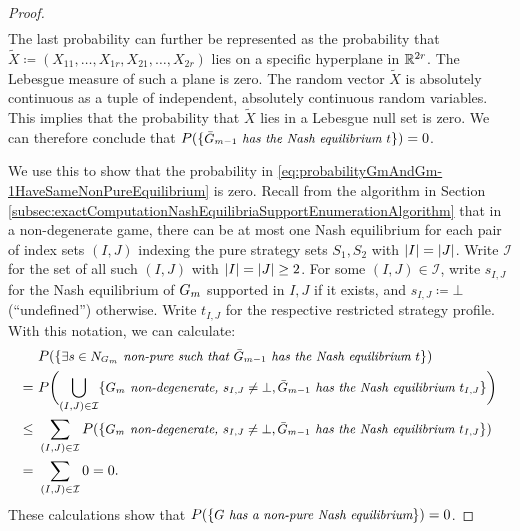 \documentclass[a4paper,DIV=11,abstracton,twoside=semi]{scrreprt}
\theoremstyle{definition}
\begin{document}
\begin{proof}[Proof]
\begin{gather*}
        \end{gather*}
        The last probability can further be represented as the probability that $\tilde{X} \coloneqq (X_{11}, \dots, X_{1r}, X_{21}, \dots, X_{2r})$ lies on a specific hyperplane in $\mathbb{R}^{2r}$. The Lebesgue measure of such a plane is zero. The random vector $\tilde{X}$ is absolutely continuous as a tuple of independent, absolutely continuous random variables. This implies that the probability that $\tilde{X}$ lies in a Lebesgue null set is zero.
        We can therefore conclude that $P(\{\textit{\small$\bar{G}_{m-1}$ has the Nash equilibrium $t$}\}) = 0$.
        
        We use this to show that the probability in \eqref{eq:probabilityGmAndGm-1HaveSameNonPureEquilibrium} is zero.
        Recall from the algorithm in Section \ref{subsec:exactComputationNashEquilibriaSupportEnumerationAlgorithm} that in a non-degenerate game, there can be at most one Nash equilibrium for each pair of index sets $(I, J)$ indexing the pure strategy sets $S_1, S_2$ with $\left| I \right| = \left| J \right|$.
        Write $\mathcal{I}$ for the set of all such $(I, J)$ with $\left| I \right| = \left| J \right| \geq 2$.
        For some $(I, J) \in \mathcal{I}$, write $s_{I,J}$ for the Nash equilibrium of $G_{m}$ supported in $I, J$ if it exists, and $s_{I,J} \coloneqq \bot$ (“undefined”) otherwise. Write $t_{I,J}$ for the respective restricted strategy profile.
        With this notation, we can calculate:
        \begin{align*}
                 &P(\{\textit{\small$\exists s \in N_{G_{m}}$ non-pure such that $\bar{G}_{m-1}$ has the Nash equilibrium $t$}\}) \\
                 =~ &P\biggl(\bigcup_{(I, J) \in \mathcal{I}}\{\textit{\small $G_{m}$ non-degenerate, $s_{I, J} \neq \bot, \bar{G}_{m-1}$ has the Nash equilibrium $t_{I, J}$}\}\biggr) \\
            \leq~ &\sum_{(I, J) \in \mathcal{I}} 
                P(\{\textit{\small $G_{m}$ non-degenerate, $s_{I, J} \neq \bot, \bar{G}_{m-1}$ has the Nash equilibrium $t_{I, J}$}\}) \\
                =~ &\sum_{(I, J) \in \mathcal{I}} 0 = 0.
        \end{align*}
        These calculations show that $P(\{\textit{\small $G$ has a non-pure Nash equilibrium}\}) = 0$.
    \end{proof}
\end{document}
